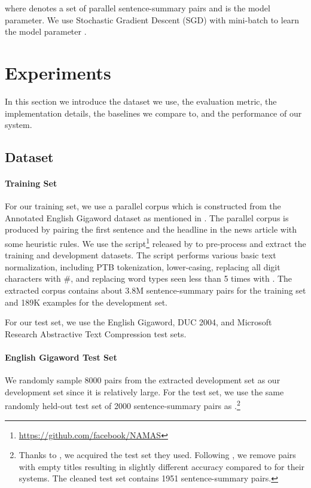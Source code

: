 \documentclass[11pt,a4paper]{article}
\newcommand{\unk}{}
\begin{document}
where  denotes a set of parallel sentence-summary pairs and  is the model parameter.
We use Stochastic Gradient Descent (SGD) with mini-batch to learn the model parameter .


 
\newcommand{\significant}{}
\newcommand{\otherpaper}{}

\section{Experiments}
\label{sec:expr}
In this section we introduce the dataset we use, the evaluation metric, the implementation details, the baselines we compare to, and the performance of our system.
\subsection{Dataset}
\paragraph{Training Set}
For our training set, we use a parallel corpus which is constructed from the Annotated English Gigaword dataset \citep{Napoles:2012:AG:2391200.2391218} as mentioned in \citet{rush-chopra-weston:2015:EMNLP}.
The parallel corpus is produced by pairing the first sentence and the headline in the news article with some heuristic rules. 
We use the script\footnote{\label{ft:absCode}\url{https://github.com/facebook/NAMAS}} released by \citet{rush-chopra-weston:2015:EMNLP} to pre-process and extract the training and development datasets.
The script performs various basic text normalization, including PTB tokenization, lower-casing, replacing all digit characters with \#, and replacing word types seen less than 5 times with \unk{}.
The extracted corpus contains about 3.8M sentence-summary pairs for the training set and 189K examples for the development set.

For our test set, we use the English Gigaword, DUC 2004, and Microsoft Research Abstractive Text Compression test sets.

\paragraph{English Gigaword Test Set}

We randomly sample 8000 pairs from the extracted development set as our development set since it is relatively large.
For the test set, we use the same randomly held-out test set of 2000 sentence-summary pairs as \citet{rush-chopra-weston:2015:EMNLP}.\footnote{Thanks to \citet{rush-chopra-weston:2015:EMNLP}, we acquired the test set they used. Following \citet{chopra-auli-rush:2016:N16-1}, we remove pairs with empty titles resulting in slightly different accuracy compared to \citet{rush-chopra-weston:2015:EMNLP} for their systems. The cleaned test set contains 1951 sentence-summary pairs.}
\end{document}
